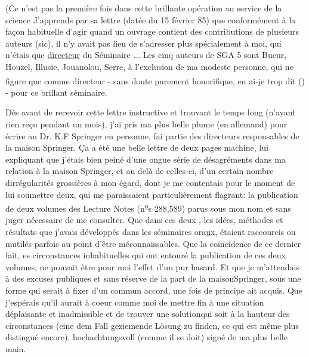 (Ce n'est pas  la première fois  dans cette brillante opération au service de la science  J'apprends par sa lettre (datée du 15 février 85) que conformément  à la façon habituelle d'agir quand un ouvrage contient des contributions de plusieurs auteurs (sic), il n'y avait pas lieu de s'adresser plus spécialement à moi, qui n'étais que \uline{directeur} du Séminaire ... \deleted{\unsure{(}}Les cinq auteurs de SGA 5 sont Bucur, Houzel, Illusie, Jouanolou, Serre, à l'exclusion de ma modeste personne, qui  ne figure que comme directeur - sans doute purement honorifique, en ai-je trop dit (\textsuperscript{}) - pour ce brillant séminaire.

Dès avant de recevoir cette lettre instructive et trouvant le temps long (n'ayant rien reçu pendant un mois), j'ai pris ma plus belle plume (en allemand) pour écrire au Dr. K.F Springer en personne,  fai partie des directeurs responsables de la maison Springer. Ça a été une belle  lettre de deux pages machine, lui expliquant que j'étais bien peiné d'une ongue série de désagréments dans ma relation à la maison Springer, et au delà de celles-ci, d'un certain nombre dirrégularités grossières à mon égard, dont je me contentais pour le moment de lui soumettre deux, qui me paraissaient particulièrement flagrant: la publication de deux volumes des Lecture Notes (n\textsuperscript{\uline{o}}s 288,589) parus sous mon nom et sans  juger nécessaire de me consulter. Que dans ces deux , les idées, méthodes et résultats que j'avais développés dans les séminaires ora\uline{u}x, étaient raccourcis ou mutilés parfois au point d'être méconnaissables. Que la coïncidence de ce dernier fait,  es circonstances inhabituelles qui ont entouré la publication de ces deux volumes, ne pouvait être pour moi l'effet d'un pur hasard. Et que je m'attendais à des excuses publiques et sans réserve de la part de la maison\handwritten{/}Springer, sous une forme qui serait à fixer d'un commun accord, une fois  de principe ait acquis. Que j'espérais qu'il aurait à coeur comme moi de mettre fin à une situation déplaisante et inadmissible et de trouver une solutionqui soit à la hauteur des circonstances (eine dem Fall geziemende Lösung zu finden, ce qui  est même plus distingué encore), hochachtungsvoll (comme il se doit) signé de ma plus belle main.

